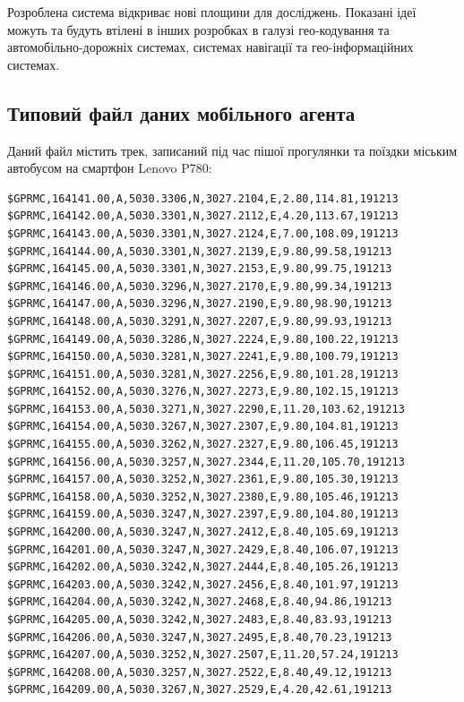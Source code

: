 \documentclass[simple,a4paper,14pt,ukrainian,utf8]{eskdtext}
\begin{document}
    Розроблена система відкриває нові площини для досліджень. Показані ідеї можуть та будуть втілені в інших розробках в галузі гео-кодування та автомобільно-дорожніх системах, системах навігації та гео-інформаційних системах.

\clearpage \newpage
\begin{appendices}
	\section{Типовий файл даних мобільного агента}

		Даний файл містить трек, записаний під час пішої прогулянки та поїздки міським автобусом на смартфон Lenovo P780:
	
\begin{small}	
\begin{lstlisting}
$GPRMC,164141.00,A,5030.3306,N,3027.2104,E,2.80,114.81,191213
$GPRMC,164142.00,A,5030.3301,N,3027.2112,E,4.20,113.67,191213
$GPRMC,164143.00,A,5030.3301,N,3027.2124,E,7.00,108.09,191213
$GPRMC,164144.00,A,5030.3301,N,3027.2139,E,9.80,99.58,191213
$GPRMC,164145.00,A,5030.3301,N,3027.2153,E,9.80,99.75,191213
$GPRMC,164146.00,A,5030.3296,N,3027.2170,E,9.80,99.34,191213
$GPRMC,164147.00,A,5030.3296,N,3027.2190,E,9.80,98.90,191213
$GPRMC,164148.00,A,5030.3291,N,3027.2207,E,9.80,99.93,191213
$GPRMC,164149.00,A,5030.3286,N,3027.2224,E,9.80,100.22,191213
$GPRMC,164150.00,A,5030.3281,N,3027.2241,E,9.80,100.79,191213
$GPRMC,164151.00,A,5030.3281,N,3027.2256,E,9.80,101.28,191213
$GPRMC,164152.00,A,5030.3276,N,3027.2273,E,9.80,102.15,191213
$GPRMC,164153.00,A,5030.3271,N,3027.2290,E,11.20,103.62,191213
$GPRMC,164154.00,A,5030.3267,N,3027.2307,E,9.80,104.81,191213
$GPRMC,164155.00,A,5030.3262,N,3027.2327,E,9.80,106.45,191213
$GPRMC,164156.00,A,5030.3257,N,3027.2344,E,11.20,105.70,191213
$GPRMC,164157.00,A,5030.3252,N,3027.2361,E,9.80,105.30,191213
$GPRMC,164158.00,A,5030.3252,N,3027.2380,E,9.80,105.46,191213
$GPRMC,164159.00,A,5030.3247,N,3027.2397,E,9.80,104.80,191213
$GPRMC,164200.00,A,5030.3247,N,3027.2412,E,8.40,105.69,191213
$GPRMC,164201.00,A,5030.3247,N,3027.2429,E,8.40,106.07,191213
$GPRMC,164202.00,A,5030.3242,N,3027.2444,E,8.40,105.26,191213
$GPRMC,164203.00,A,5030.3242,N,3027.2456,E,8.40,101.97,191213
$GPRMC,164204.00,A,5030.3242,N,3027.2468,E,8.40,94.86,191213
$GPRMC,164205.00,A,5030.3242,N,3027.2483,E,8.40,83.93,191213
$GPRMC,164206.00,A,5030.3247,N,3027.2495,E,8.40,70.23,191213
$GPRMC,164207.00,A,5030.3252,N,3027.2507,E,11.20,57.24,191213
$GPRMC,164208.00,A,5030.3257,N,3027.2522,E,8.40,49.12,191213
$GPRMC,164209.00,A,5030.3267,N,3027.2529,E,4.20,42.61,191213

\end{lstlisting}
\end{small}
\end{appendices}
\end{document}
